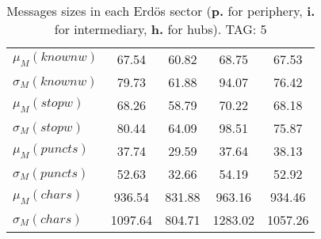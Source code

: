 \begin{table}[h!]
\begin{center}
\begin{tabular}{| l || c | c | c | c |}
$\mu_M(knownw)$ & 67.54  & 60.82  & 68.75  & 67.53 \\
$\sigma_M(knownw)$ & 79.73  & 61.88  & 94.07  & 76.42 \\\hline
$\mu_M(stopw)$ & 68.26  & 58.79  & 70.22  & 68.18 \\
$\sigma_M(stopw)$ & 80.44  & 64.09  & 98.51  & 75.87 \\\hline
$\mu_M(puncts)$ & 37.74  & 29.59  & 37.64  & 38.13 \\
$\sigma_M(puncts)$ & 52.63  & 32.66  & 54.19  & 52.92 \\\hline
$\mu_M(chars)$ & 936.54  & 831.88  & 963.16  & 934.46 \\
$\sigma_M(chars)$ & 1097.64  & 804.71  & 1283.02  & 1057.26 \\\hline
\end{tabular}
\caption{Messages sizes in each Erd\"os sector ({{\bf p.}} for periphery, {{\bf i.}} for intermediary, {{\bf h.}} for hubs). TAG: 5}
\end{center}
\end{table}